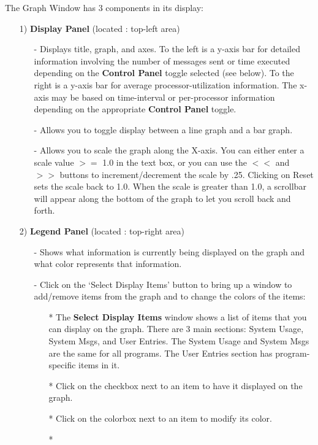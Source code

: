 \documentclass[10pt]{report}
\begin{document}
The Graph Window has 3 components in its display:
\begin{enumerate}
\item[1)]
{\bf Display Panel} (located : top-left area)
   \begin{itemize}
   \item[-]
   Displays title, graph, and axes. To the left is a y-axis bar for
   detailed information involving the number of messages sent or time
   executed depending on the {\bf Control Panel} toggle selected (see 
   below). To the right is a y-axis bar for average processor-utilization 
   information. The x-axis may be based on time-interval or per-processor
   information depending on the appropriate {\bf Control Panel} toggle.
   \item[-]
   Allows you to toggle display between a line graph and a bar graph.
   \item[-]
   Allows you to scale the graph along the X-axis.  You can either
   enter a scale value $>=$ 1.0 in the text box, or you can use the
   $<<$ and $>>$ buttons to increment/decrement the scale by .25.
   Clicking on Reset sets the scale back to 1.0.  When the scale is
   greater than 1.0, a scrollbar will appear along the bottom of the
   graph to let you scroll back and forth.
   \end{itemize}
\item[2)]
{\bf Legend Panel} (located : top-right area)
   \begin{itemize}
   \item[-]
   Shows what information is currently being displayed on the graph and 
   what color represents that information.
   \item[-]
   Click on the `Select Display Items' button to bring up a window to
   add/remove items from the graph and to change the colors of the items:
      \begin{itemize}
      \item[*]
      The {\bf Select Display Items} window shows a list of items that you
      can display on the graph.  There are 3 main sections: System
      Usage, System Msgs, and User Entries. The System Usage and System
      Msgs are the same for all programs. The User Entries section
      has program-specific items in it.
      \item[*]
      Click on the checkbox next to an item to have it displayed on the
      graph.
      \item[*]
      Click on the colorbox next to an item to modify its color.
      \item[*]

\end{itemize}
\end{itemize}
\end{enumerate}
\end{document}
